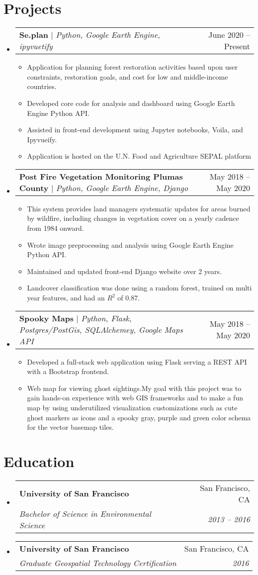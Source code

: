 \documentclass[letterpaper,11pt]{article}
\makeatletter
\newcommand{\resumeItem}[1]{
  \item\small{
    {#1 \vspace{-2pt}}
  }
}
\newcommand{\resumeSubheading}[4]{
  \vspace{-2pt}\item
    \begin{tabular*}{0.97\textwidth}[t]{l@{\extracolsep{\fill}}r}
      \textbf{#1} & #2 \\
      \textit{\small#3} & \textit{\small #4} \\
    \end{tabular*}\vspace{-7pt}
}
\newcommand{\resumeProjectHeading}[2]{
    \item
    \begin{tabular*}{0.97\textwidth}{l@{\extracolsep{\fill}}r}
      \small#1 & #2 \\
    \end{tabular*}\vspace{-7pt}
}
\newcommand{\resumeSubHeadingListStart}{\begin{itemize}[leftmargin=0.15in, label={}]}
\newcommand{\resumeSubHeadingListEnd}{\end{itemize}}
\newcommand{\resumeItemListStart}{\begin{itemize}}
\newcommand{\resumeItemListEnd}{\end{itemize}\vspace{-5pt}}
\makeatother
\begin{document}
\section{Projects}
    \resumeSubHeadingListStart
      \resumeProjectHeading
          {\textbf{Se.plan} $|$ \emph{Python, Google Earth Engine, ipyvuetify}}{June 2020 -- Present}
          \resumeItemListStart
            \resumeItem{Application for planning forest restoration activities based upon user constraints, restoration goals, and cost for low and middle-income countries.}
            \resumeItem{Developed core code for analysis and dashboard using Google Earth Engine Python API.}
            \resumeItem{Assisted in front-end development using Jupyter notebooks, Voila, and Ipyvueify.}
            \resumeItem{Application is hosted on the U.N. Food and Agriculture SEPAL platform}
          \resumeItemListEnd
      \resumeProjectHeading
          {\textbf{Post Fire Vegetation Monitoring Plumas County} $|$ \emph{Python, Google Earth Engine, Django}}{May 2018 -- May 2020}
          \resumeItemListStart
            \resumeItem{This system provides land managers systematic updates for areas burned by wildfire, including changes in vegetation cover on a yearly cadence from 1984 onward.}
            \resumeItem{Wrote image preprocessing and analysis using Google Earth Engine Python API.}
            \resumeItem{Maintained and updated front-end Django website over 2 years.}
            \resumeItem{Landcover classification was done using a random forest, trained on multi year features, and had an $R^2$ of 0.87.}
          \resumeItemListEnd
          \resumeProjectHeading
          {\textbf{Spooky Maps} $|$ \emph{Python, Flask, Postgres/PostGis, SQLAlchemey, Google Maps API}}{May 2018 -- May 2020}
          \resumeItemListStart
            \resumeItem{Developed a full-stack web application using Flask serving a REST API with a Bootstrap frontend.}
            \resumeItem{Web map for viewing ghost sightings.My goal with this project was to gain hands-on experience with web GIS frameworks and to make a fun map by using underutilized visualization customizations such as cute ghost markers as icons and a spooky gray, purple and green color schema for the vector basemap tiles.}
          \resumeItemListEnd
    \resumeSubHeadingListEnd

\section{Education}
  \resumeSubHeadingListStart
    \resumeSubheading
      {University of San Francisco}{San Francisco, CA}
      {Bachelor of Science in Environmental Science}{2013 -- 2016}
    \resumeSubheading
      {University of San Francisco}{San Francisco, CA}
      {Graduate Geospatial Technology Certification}{2016}
  \resumeSubHeadingListEnd

%



\end{document}
